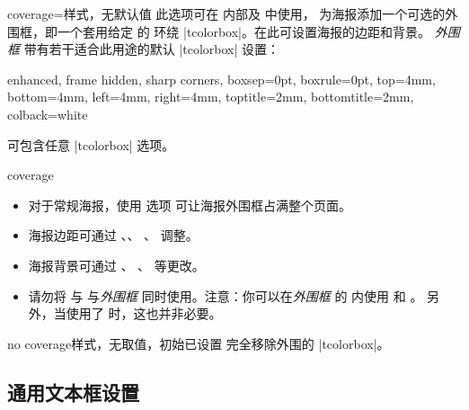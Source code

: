 \begin{postersetTcbKey}[][doc new=2017-07-03]{coverage}{=}{样式，无默认值}
  此选项可在  内部及  中使用，
  为海报添加一个可选的外围框，即一个套用给定  的
  环绕 |tcolorbox|。在此可设置海报的边距和背景。
  \emph{外围框} 带有若干适合此用途的默认 |tcolorbox| 设置：
\begin{dispListing}
enhanced, frame hidden, sharp corners, boxsep=0pt, boxrule=0pt,
top=4mm, bottom=4mm, left=4mm, right=4mm,
toptitle=2mm, bottomtitle=2mm, colback=white
\end{dispListing}

 可包含任意 |tcolorbox| 选项。

\begin{exdispExample}{coverage}
\begin{tcbposter}[
  poster   = {showframe,spacing=1mm},
  coverage = {height=5cm,
              interior style={top color=yellow,bottom color=yellow!50!red},
              watermark text={My Poster},watermark color=white,
             },
]
\end{tcbposter}
\end{exdispExample}

\begin{itemize}
\item 对于常规海报，使用  选项
  可让海报外围框占满整个页面。
\item 海报边距可通过 、、
  、 调整。
\item 海报背景可通过 、
  、 等更改。
\item 请勿将  与 
  与\emph{外围框} 同时使用。注意：你可以在\emph{外围框} 的
   内使用  和 。
  另外，当使用了  时，这也并非必要。
\end{itemize}
\end{postersetTcbKey}


\begin{postersetTcbKey}[][doc new=2017-07-03]{no coverage}{}{样式，无取值，初始已设置}
  完全移除外围的 |tcolorbox|。
\end{postersetTcbKey}

\clearpage
\subsection{通用文本框设置}\label{subsec:poster_boxsettings}


